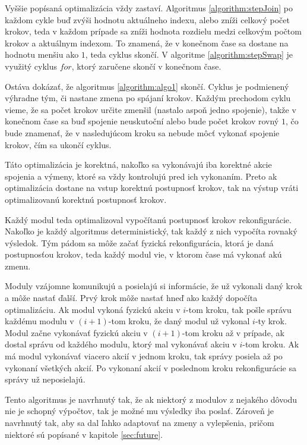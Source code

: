 \documentclass[
  digital, %
  oneside, %
  notable,   %
  lof,     %
  nolot,     %
]{fithesis3}
\begin{document}
Vyššie popísaná optimalizácia vždy zastaví. Algoritmus \ref{algorithm:stepJoin} po každom cykle buď zvýši hodnotu aktuálneho indexu, alebo zníži celkový počet krokov, teda v každom prípade sa zníži hodnota rozdielu medzi celkovým počtom krokov a aktuálnym indexom. To znamená, že v konečnom čase sa dostane na hodnotu menšiu ako $1$, teda cyklus skončí. V algoritme \ref{algorithm:stepSwap} je využitý cyklus $for$, ktorý zaručene skončí v konečnom čase. 

Ostáva dokázať, že algoritmus \ref{algorithm:algo1} skončí. Cyklus je podmienený výhradne tým, či nastane zmena po spájaní krokov. Každým prechodom cyklu vieme, že sa počet krokov určite zmenšil (nastalo aspoň jedno spojenie), takže v konečnom čase sa buď spojenie neuskutoční alebo bude počet krokov rovný $1$, čo bude znamenať, že v nasledujúcom kroku sa nebude môcť vykonať spojenie krokov, čím sa ukončí cyklus. 

Táto optimalizácia je korektná, nakoľko sa vykonávajú iba korektné akcie spojenia a výmeny, ktoré sa vždy kontrolujú pred ich vykonaním. Preto ak optimalizácia dostane na vstup korektnú postupnosť krokov, tak na výstup vráti optimalizovanú korektnú postupnosť krokov. 

Každý modul teda optimalizoval vypočítanú postupnosť krokov rekonfigurácie. Nakoľko je každý algoritmus deterministický, tak každý z nich vypočíta rovnaký výsledok. Tým pádom sa môže začať fyzická rekonfigurácia, ktorá je daná postupnosťou krokov, teda každý modul vie, v ktorom čase má vykonať akú zmenu. 

Moduly vzájomne komunikujú a posielajú si informácie, že už vykonali daný krok a môže nastať ďalší. Prvý krok môže nastať hneď ako každý dopočíta optimalizáciu. Ak modul vykoná fyzickú akciu v $i$-tom kroku, tak pošle správu každému modulu v $(i + 1)$-tom kroku, že daný modul už vykonal $i$-ty krok. Modul začne vykonávať fyzickú akciu v $(i + 1)$-tom kroku až v prípade, ak dostal správu od každého modulu, ktorý mal vykonávať akciu v $i$-tom kroku. Ak má modul vykonávať viacero akcií v jednom kroku, tak správy posiela až po vykonaní všetkých akcií. Po vykonaní akcií v poslednom kroku rekonfigurácie sa správy už neposielajú. 

Tento algoritmus je navrhnutý tak, že ak niektorý z modulov z nejakého dôvodu nie je schopný výpočtov, tak je možné mu výsledky iba poslať. Zároveň je navrhnutý tak, aby sa dal ľahko adaptovať na zmeny a vylepšenia, pričom niektoré sú popísané v kapitole \ref{sec:future}.  
\end{document}
